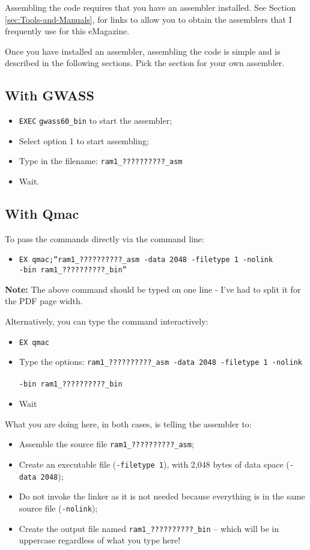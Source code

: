 Assembling the code requires that you have an assembler installed.
See Section \ref{sec:Tools-and-Manuals}, 
for links to allow you to obtain the assemblers that I frequently
use for this eMagazine.

Once you have installed an assembler, assembling the code is simple
and is described in the following sections. Pick the section for your
own assembler.

\subsection{With GWASS}
\begin{itemize}
\item \texttt{EXEC} \texttt{gwass60\_bin} to start the assembler;
\item Select option 1 to start assembling;
\item Type in the filename: \texttt{ram1\_??????????\_asm}
\item Wait.
\end{itemize}

\subsection{With Qmac}

To pass the commands directly via the command line:
\begin{itemize}
\item \texttt{EX qmac;``ram1\_??????????\_asm -data 2048 -filetype 1 -nolink
}~\\
\texttt{-bin ram1\_??????????\_bin''}
\end{itemize}
\textbf{Note:} The above command should be typed on one line - I've
had to split it for the PDF page width. 

Alternatively, you can type the command interactively:
\begin{itemize}
\item \texttt{EX qmac}
\item Type the options: \texttt{ram1\_??????????\_asm -data 2048 -filetype
1 -nolink }~\\
\texttt{-bin ram1\_??????????\_bin}
\item Wait
\end{itemize}
What you are doing here, in both cases, is telling the assembler to:
\begin{itemize}
\item Assemble the source file \texttt{ram1\_??????????\_asm};
\item Create an executable file (\texttt{-filetype 1}), with 2,048 bytes
of data space (\texttt{-data 2048});
\item Do not invoke the linker as it is not needed because everything is
in the same source file (\texttt{-nolink});
\item Create the output file named \texttt{ram1\_??????????\_bin} -- which
will be in uppercase regardless of what you type here!
\end{itemize}

